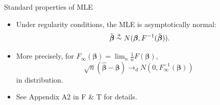 \documentclass{beamer}
\newcommand{\boldbeta}{{\boldsymbol \beta}}
\newenvironment{wideitemize}%
  {\begin{itemize}%
    \setlength{\parskip}{1em}}%
  {\end{itemize}}
\begin{document}
\begin{frame} {Standard properties of MLE}
\begin{wideitemize}
\item
Under regularity conditions, the MLE is asymptotically normal:
$$\; \hat{\mbox{\boldmath $\beta$}}\stackrel{a}{\sim}
N(\mbox{\boldmath $\beta$}, F^{-1}(\hat{\mbox{\boldmath $\beta$}})).$$


\item More precisely, for $F_\infty (\boldbeta) =  \lim_n \frac{1}{n} F(\boldbeta) $,
\[
\sqrt{n} (\hat{\boldsymbol \beta} - {\boldsymbol \beta}) \longrightarrow_d N(0, F_\infty^{-1} ({\boldsymbol \beta}))
\]
in distribution. 
\item See Appendix A2 in F \& T for details.
\end{wideitemize}

\end{frame}
%
%
%
%
%
%
%
%
%
%
%
%
%
%
%
%
%
%
%
\end{document}
